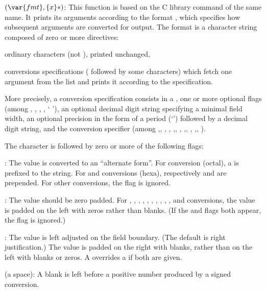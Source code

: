 $(\var{fmt},\{x\}*)$: \label{se:printf}This function is based on the C library command of the same name.
It prints its arguments according to the format , which specifies how
subsequent arguments are converted for output. The format is a
character string composed of zero or more directives:

\item ordinary characters (not \kbd{\%}), printed unchanged,

\item conversions specifications (\kbd{\%} followed by some characters)
which fetch one argument from the list and prints it according to the
specification.

More precisely, a conversion specification consists in a \kbd{\%}, one or more
optional flags (among \kbd{\#}, , \kbd{-}, \kbd{+}, ` '), an optional
decimal digit string specifying a minimal field width, an optional precision
in the form of a period (`') followed by a decimal digit string, and
the conversion specifier (among ,, , ,
,, , ,, , ,, ).

 The character \kbd{\%} is followed by zero or
more of the following flags:

\item \kbd{\#}: The value is converted to an ``alternate form''. For
 conversion (octal), a  is prefixed to the string. For 
and  conversions (hexa), respectively  and  are
prepended. For other conversions, the flag is ignored.

\item {}: The value should be zero padded. For
,
,
,
,
,
,
,
,
,
, and
 conversions, the value is padded on the left with zeros rather than
blanks. (If the  and \kbd{-} flags both appear, the  flag is
ignored.)

\item \kbd{-}: The value is left adjusted on the field boundary. (The
default is right justification.) The value is padded on the right with
blanks, rather than on the left with blanks or zeros. A \kbd{-} overrides a
 if both are given.

\item {} (a space): A blank is left before a positive number
produced by a signed conversion.

